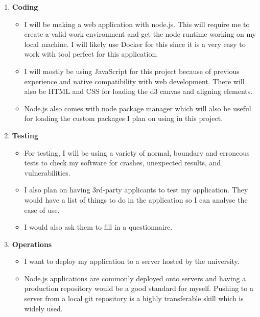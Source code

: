 \documentclass{report}
\begin{document}
\begin{enumerate}
    \item \textbf{\large{Coding}}
    \begin{itemize}
        \item I will be making a web application with node.js. This will require me to create a valid work environment and get the node runtime working on my local machine. I will likely use Docker for this since it is a very easy to work with tool perfect for this application.
        \item I will mostly be using JavaScript for this project because of previous experience and native compatibility with web development. There will also be HTML and CSS for loading the d3 canvas and aligning elements.
        \item Node.js also comes with node package manager which will also be useful for loading the custom packages I plan on using in this project.
    \end{itemize}
    \item \textbf{\large{Testing}}
    \begin{itemize}
        \item For testing, I will be using a variety of normal, boundary and erroneous tests to check my software for crashes, unexpected results, and vulnerabilities.
        \item I also plan on having 3rd-party applicants to test my application. They would have a list of things to do in the application so I can analyse the ease of use.
        \item I would also ask them to fill in a questionnaire.
    \end{itemize}
    \item \textbf{\large{Operations}}
    \begin{itemize}
        \item I want to deploy my application to a server hosted by the university.
        \item Node.js applications are commonly deployed onto servers and having a production repository would be a good standard for myself. Pushing to a server from a local git repository is a highly transferable skill which is widely used.
    \end{itemize}
\end{enumerate}
\end{document}
